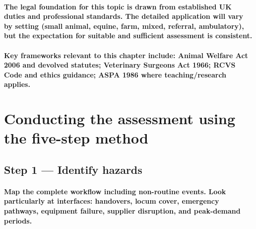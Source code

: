 \paragraph{The legal foundation for this topic is drawn from established UK duties and professional standards. The detailed application will vary by setting (small animal, equine, farm, mixed, referral, ambulatory), but the expectation for suitable and sufficient assessment is consistent.}

\paragraph{Key frameworks relevant to this chapter include: Animal Welfare Act 2006 and devolved statutes; Veterinary Surgeons Act 1966; RCVS Code and ethics guidance; ASPA 1986 where teaching/research applies.}

\begin{itemize}
\end{itemize}

\section{Conducting the assessment using the five-step method}

\subsection{Step 1 — Identify hazards}
\paragraph{Map the complete workflow including non-routine events. Look particularly at interfaces: handovers, locum cover, emergency pathways, equipment failure, supplier disruption, and peak-demand periods.}

